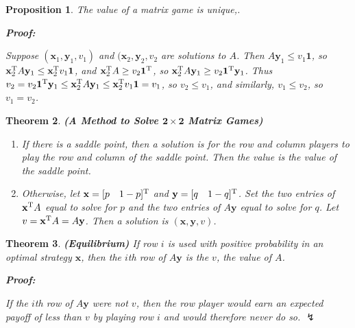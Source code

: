 \documentclass{article}
\theoremstyle{colontheorem}
\newtheorem{theorem}{Theorem}[section]
\newtheorem{proposition}[theorem]{Proposition}
\newcommand{\T}{^\textnormal{T}}
\newenvironment{Theorem}
{
	\begin{mdframed}[backgroundcolor=TheoremOrange!10]
	\begin{theorem}
}
{
	\end{theorem}
	\end{mdframed}
	
	\vspace{.15in}
}
\newenvironment{Proposition}
{
	\begin{mdframed}[backgroundcolor=TheoremOrange!10]
	\begin{proposition}
}
{
	\end{proposition}
	\end{mdframed}
	
	\vspace{.15in}
}
\newenvironment{Proof}
{
	\begin{mdframed}[backgroundcolor=ProofPurple!10]
	\textbf{Proof:}%
}
{
	\end{mdframed}
	
	\vspace{.085in}
}
\begin{document}
\begin{Proposition}
	
	The value of a matrix game is unique,.
	
	\begin{Proof}
		Suppose $(\mathbf{x}_1, \mathbf{y}_1, v_1)$ and $(\mathbf{x}_2, \mathbf{y}_2, v_2$ are solutions to $A$. Then $A \mathbf{y}_1 \leq v_1 \mathbf{1}$, so $\mathbf{x}_2\T A \mathbf{y}_1 \leq \mathbf{x}_2\T v_1 \mathbf{1}$, and $\mathbf{x}_2\T A \geq v_2 \mathbf{1}\T$, so $\mathbf{x}_2\T A \mathbf{y}_1 \geq v_2 \mathbf{1}\T \mathbf{y}_1$. Thus $v_2 = v_2 \mathbf{1}\T \mathbf{y}_1 \leq \mathbf{x}_2\T A \mathbf{y}_1 \leq \mathbf{x}_2\T v_1 \mathbf{1} = v_1$, so $v_2 \leq v_1$, and similarly, $v_1 \leq v_2$, so $v_1 = v_2$.
		
	\end{Proof}
	
\end{Proposition}



\begin{Theorem}
	
	\textbf{(A Method to Solve $\mathbf{2 \times 2}$ Matrix Games)}
	
	\begin{enumerate}
		
		\item If there is a saddle point, then a solution is for the row and column players to play the row and column of the saddle point. Then the value is the value of the saddle point.
		
		\item Otherwise, let $\mathbf{x} = [p\ \ \ 1-p]\T$ and $\mathbf{y} = [q\ \ \ 1-q]\T$. Set the two entries of $\mathbf{x}\T A$ equal to solve for $p$ and the two entries of $A \mathbf{y}$ equal to solve for $q$. Let $v = \mathbf{x}\T A = A \mathbf{y}$. Then a solution is $(\mathbf{x}, \mathbf{y}, v)$.
		
	\end{enumerate}
	
\end{Theorem}



\begin{Theorem}
	
	\textbf{(Equilibrium)} If row $i$ is used with positive probability in an optimal strategy $\mathbf{x}$, then the $i$th row of $A\mathbf{y}$ is the $v$, the value of $A$.
	
	\begin{Proof}
		If the $i$th row of $A\mathbf{y}$ were not $v$, then the row player would earn an expected payoff of less than $v$ by playing row $i$ and would therefore never do so. $\lightning$
		
	\end{Proof}
	
\end{Theorem}
\end{document}
